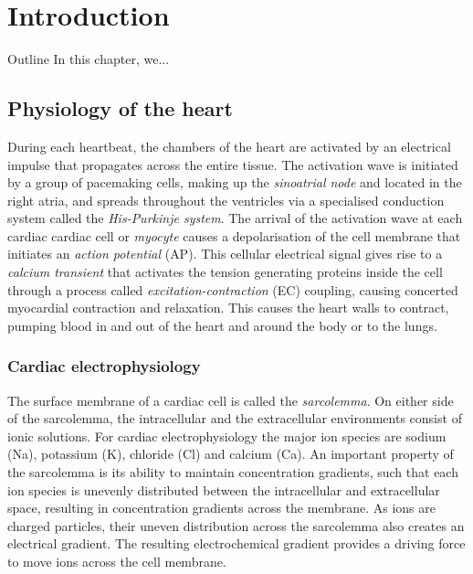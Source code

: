 \chapter{Introduction}\label{cha:chapter1}
%
%
%
\begin{remark}{Outline}
    In this chapter, we...
\end{remark}


%
%
%
\section{Physiology of the heart}
During each heartbeat, the chambers of the heart are activated by an electrical impulse that propagates across the entire tissue. The activation wave is initiated by a group of pacemaking cells, making up the \textit{sinoatrial node} and located in the right atria, and spreads throughout the ventricles via a specialised conduction system called the \textit{His-Purkinje system}. The arrival of the activation wave at each cardiac cardiac cell or \textit{myocyte} causes a depolarisation of the cell membrane that initiates an \textit{action potential} (\acs{AP}). This cellular electrical signal gives rise to a \textit{calcium transient} that activates the tension generating proteins inside the cell through a process called \textit{excitation-contraction} (\acs{EC}) coupling, causing concerted myocardial contraction and relaxation. This causes the heart walls to contract, pumping blood in and out of the heart and around the body or to the lungs. 



%
%
%
\subsection{Cardiac electrophysiology}\label{sec:cardiacelecphys}
The surface membrane of a cardiac cell is called the \textit{sarcolemma}. On either side of the sarcolemma, the intracellular and the extracellular environments consist of ionic solutions. For cardiac electrophysiology the major ion species are sodium (\acs{Na}), potassium (\acs{K}), chloride (\acs{Cl}) and calcium (\acs{Ca}). An important property of the sarcolemma is its ability to maintain concentration gradients, such that each ion species is unevenly distributed between the intracellular and extracellular space, resulting in concentration gradients across the membrane. As ions are charged particles, their uneven distribution across the sarcolemma also creates an electrical gradient. The resulting electrochemical gradient provides a driving force to move ions across the cell membrane.

